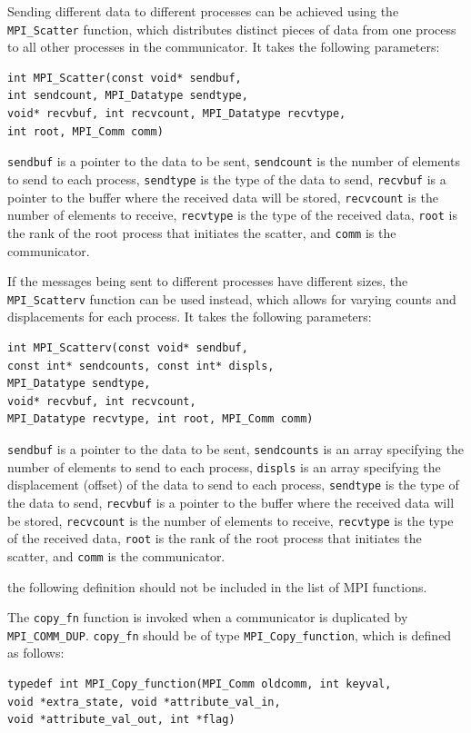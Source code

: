\documentclass[letterpaper]{report}
\begin{document}
Sending different data to different processes can be achieved using the \texttt{MPI\_Scatter}
function, which distributes distinct pieces of data from one process
to all other processes in the communicator. It takes the following parameters:

\begin{verbatim}
int MPI_Scatter(const void* sendbuf,
int sendcount, MPI_Datatype sendtype,
void* recvbuf, int recvcount, MPI_Datatype recvtype,
int root, MPI_Comm comm)
\end{verbatim}

\texttt{sendbuf} is a pointer to the data to be sent, \texttt{sendcount} is the number
of elements to send to each process, \texttt{sendtype} is the type of the data to send,
\texttt{recvbuf} is a pointer to the buffer where the received data will be stored,
\texttt{recvcount} is the number of elements to receive, \texttt{recvtype} is the type
of the received data, \texttt{root} is the rank of the root process that initiates the scatter,
and \texttt{comm} is the communicator.

If the messages being sent to different processes have different sizes,
the \texttt{MPI\_Scatterv} function can be used instead, which allows
for varying counts and displacements for each process.
It takes the following parameters:

\begin{verbatim}
int MPI_Scatterv(const void* sendbuf,
const int* sendcounts, const int* displs,
MPI_Datatype sendtype,
void* recvbuf, int recvcount,
MPI_Datatype recvtype, int root, MPI_Comm comm)
\end{verbatim}

\texttt{sendbuf} is a pointer to the data to be sent,
\texttt{sendcounts} is an array specifying the number
of elements to send to each process, \texttt{displs} is an
array specifying the displacement (offset) of the data to
send to each process, \texttt{sendtype} is the type of the data to send,
\texttt{recvbuf} is a pointer to the buffer where the received data
will be stored, \texttt{recvcount} is the number of elements to receive,
\texttt{recvtype} is the type of the received data, \texttt{root} is the rank
of the root process that initiates the scatter, and \texttt{comm} is the communicator.

the following definition should not be included in the list of MPI functions.

The \texttt{copy\_fn} function is invoked when a communicator is duplicated by
\texttt{MPI\_COMM\_DUP}. \texttt{copy\_fn} should be of type \texttt{MPI\_Copy\_function}, which is defined as follows:

\begin{verbatim}
typedef int MPI_Copy_function(MPI_Comm oldcomm, int keyval,
void *extra_state, void *attribute_val_in,
void *attribute_val_out, int *flag)
\end{verbatim}
\end{document}

